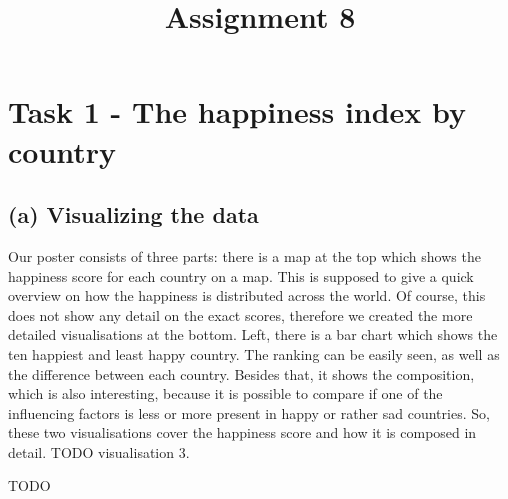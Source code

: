 \documentclass[a4paper]{article}
\date{}
\author{}
\title{\textbf{Assignment 8}}
\begin{document}
\maketitle 
\thispagestyle{fancy}

\section*{Task 1 - The happiness index by country}
\subsection*{(a) Visualizing the data}
Our poster consists of three parts: there is a map at the top which shows the happiness score for each country on a map. 
This is supposed to give a quick overview on how the happiness is distributed across the world. 
Of course, this does not show any detail on the exact scores, therefore we created the more detailed visualisations at the bottom. 
Left, there is a bar chart which shows the ten happiest and least happy country. 
The ranking can be easily seen, as well as the difference between each country. 
Besides that, it shows the composition, which is also interesting, because it is possible to compare if one of the influencing factors is less or more present in happy or rather sad countries. 
So, these two visualisations cover the happiness score and how it is composed in detail. 
TODO visualisation 3. 

TODO
\end{document}
